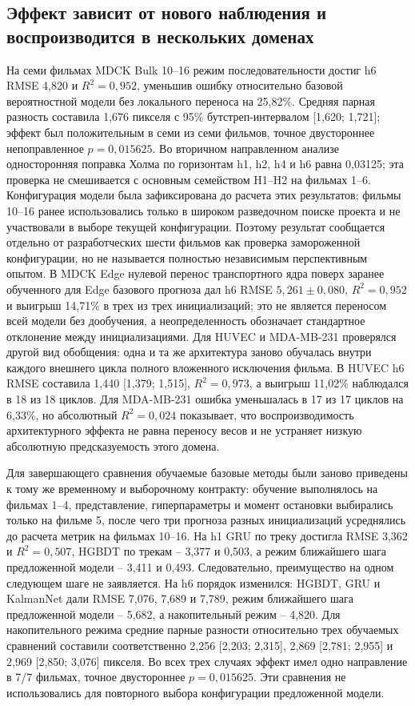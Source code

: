 \documentclass[11pt,a4paper]{article}
\begin{document}
\subsection{Эффект зависит от нового наблюдения и воспроизводится в нескольких доменах}
На семи фильмах MDCK Bulk 10--16 режим последовательности достиг h6 RMSE 4,820 и $R^2=0{,}952$, уменьшив ошибку относительно базовой вероятностной модели без локального переноса на 25,82\%. Средняя парная разность составила 1,676 пикселя с 95\% бутстреп-интервалом [1,620; 1,721]; эффект был положительным в семи из семи фильмов, точное двустороннее непоправленное $p=0{,}015625$. Во вторичном направленном анализе односторонняя поправка Холма по горизонтам h1, h2, h4 и h6 равна 0,03125; эта проверка не смешивается с основным семейством H1--H2 на фильмах 1--6. Конфигурация модели была зафиксирована до расчета этих результатов; фильмы 10--16 ранее использовались только в широком разведочном поиске проекта и не участвовали в выборе текущей конфигурации. Поэтому результат сообщается отдельно от разработческих шести фильмов как проверка замороженной конфигурации, но не называется полностью независимым перспективным опытом. В MDCK Edge нулевой перенос транспортного ядра поверх заранее обученного для Edge базового прогноза дал h6 RMSE $5{,}261\pm0{,}080$, $R^2=0{,}952$ и выигрыш 14,71\% в трех из трех инициализаций; это не является переносом всей модели без дообучения, а неопределенность обозначает стандартное отклонение между инициализациями. Для HUVEC и MDA-MB-231 проверялся другой вид обобщения: одна и та же архитектура заново обучалась внутри каждого внешнего цикла полного вложенного исключения фильма. В HUVEC h6 RMSE составила 1,440 [1,379; 1,515], $R^2=0{,}973$, а выигрыш 11,02\% наблюдался в 18 из 18 циклов. Для MDA-MB-231 ошибка уменьшалась в 17 из 17 циклов на 6,33\%, но абсолютный $R^2=0{,}024$ показывает, что воспроизводимость архитектурного эффекта не равна переносу весов и не устраняет низкую абсолютную предсказуемость этого домена.

Для завершающего сравнения обучаемые базовые методы были заново приведены к тому же временному и выборочному контракту: обучение выполнялось на фильмах 1--4, представление, гиперпараметры и момент остановки выбирались только на фильме 5, после чего три прогноза разных инициализаций усреднялись до расчета метрик на фильмах 10--16. На h1 GRU по треку достигла RMSE 3,362 и $R^2=0{,}507$, HGBDT по трекам -- 3,377 и 0,503, а режим ближайшего шага предложенной модели -- 3,411 и 0,493. Следовательно, преимущество на одном следующем шаге не заявляется. На h6 порядок изменился: HGBDT, GRU и KalmanNet дали RMSE 7,076, 7,689 и 7,789, режим ближайшего шага предложенной модели -- 5,682, а накопительный режим -- 4,820. Для накопительного режима средние парные разности относительно трех обучаемых сравнений составили соответственно 2,256 [2,203; 2,315], 2,869 [2,781; 2,955] и 2,969 [2,850; 3,076] пикселя. Во всех трех случаях эффект имел одно направление в 7/7 фильмах, точное двустороннее $p=0{,}015625$. Эти сравнения не использовались для повторного выбора конфигурации предложенной модели.
\end{document}
